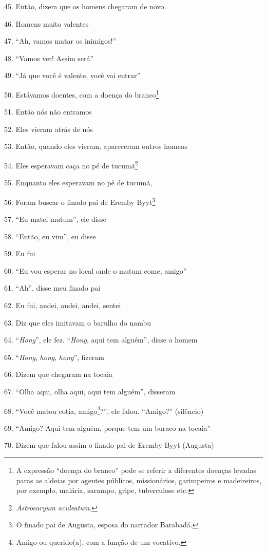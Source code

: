 45. Então, dizem que os homens chegaram de novo

46. Homens muito valentes

47. ``Ah, vamos matar os inimigos!''

48. ``Vamos ver! Assim será''

49. ``Já que você é valente, você vai entrar''

50. Estávamos doentes, com a doença do branco\footnote{A expressão
  ``doença do branco'' pode se referir a diferentes doenças levadas
  paras as aldeias por agentes públicos, missionários, garimpeiros e
  madeireiros, por exemplo, malária, sarampo, gripe, tuberculose etc.}

51. Então nós não entramos

52. Eles vieram atrás de nós

53. Então, quando eles vieram, apareceram outros homens

54. Eles esperavam caça no pé de tucumã\footnote{\emph{Astrocaryum
  aculeatum}.}

55. Enquanto eles esperavam no pé de tucumã,

56. Foram buscar o finado pai de Eremby Byyt\footnote{O finado pai de
  Augusta, esposa do narrador Barabadá.}

57. ``Eu matei mutum'', ele disse

58. ``Então, eu vim'', eu disse

59. Eu fui

60. ``Eu vou esperar no local onde o mutum come, amigo''

61. ``Ah'', disse meu finado pai

62. Eu fui, andei, andei, andei, sentei

63. Diz que eles imitavam o barulho do nambu

64. ``\emph{Hong}'', ele fez. ``\emph{Hong}, aqui tem alguém'', disse o homem

65. ``\emph{Hong}, \emph{hong}, \emph{hong}'', fizeram

66. Dizem que chegaram na tocaia

67. ``Olha aqui, olha aqui, aqui tem alguém'', disseram

68. ``Você matou cotia, amigo\footnote{Amigo ou querido(a), com a função
  de um vocativo.}?'', ele falou. ``Amigo?'' (silêncio)

69. ``Amigo? Aqui tem alguém, porque tem um buraco na tocaia''

70. Dizem que falou assim o finado pai de Eremby Byyt (Augusta)

